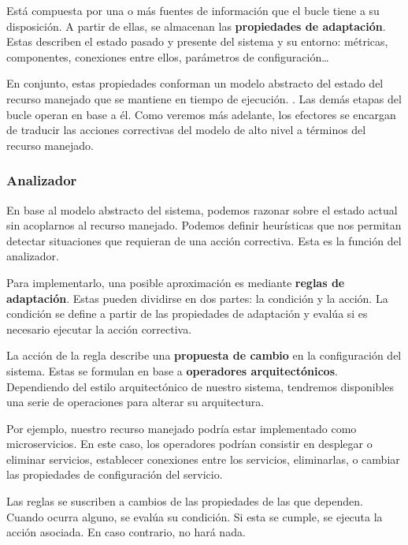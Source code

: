 Está compuesta por una o más fuentes de información que el bucle tiene a su disposición. A partir de ellas, se almacenan las \textbf{propiedades de adaptación}. Estas describen el estado pasado y presente del sistema y su entorno: métricas, componentes, conexiones entre ellos, parámetros de configuración\dots

En conjunto, estas propiedades conforman un modelo abstracto del estado del recurso manejado que se mantiene en tiempo de ejecución. \cite{garlanIncreasingSystemDependability2003}. Las demás etapas del bucle operan en base a él. Como veremos más adelante, los efectores se encargan de traducir las acciones correctivas del modelo de alto nivel a términos del recurso manejado.

\subsubsection{Analizador}

En base al modelo abstracto del sistema, podemos razonar sobre el estado actual sin acoplarnos al recurso manejado. Podemos definir heurísticas que nos permitan detectar situaciones que requieran de una acción correctiva. Esta es la función del analizador.

Para implementarlo, una posible aproximación es mediante \textbf{reglas de adaptación}. Estas pueden dividirse en dos partes: la condición y la acción. La condición se define a partir de las propiedades de adaptación y evalúa si es necesario ejecutar la acción correctiva.

La acción de la regla describe una \textbf{propuesta de cambio} en la configuración del sistema. Estas se formulan en base a \textbf{operadores arquitectónicos}. \cite{garlanIncreasingSystemDependability2003} Dependiendo del estilo arquitectónico de nuestro sistema, tendremos disponibles una serie de operaciones para alterar su arquitectura.

Por ejemplo, nuestro recurso manejado podría estar implementado como microservicios. En este caso, los operadores podrían consistir en desplegar o eliminar servicios, establecer conexiones entre los servicios, eliminarlas, o cambiar las propiedades de configuración del servicio. \cite{fonsServiciosAdaptivereadyPara2021}

Las reglas se suscriben a cambios de las propiedades de las que dependen. Cuando ocurra alguno, se evalúa su condición. Si esta se cumple, se ejecuta la acción asociada. En caso contrario, no hará nada.

